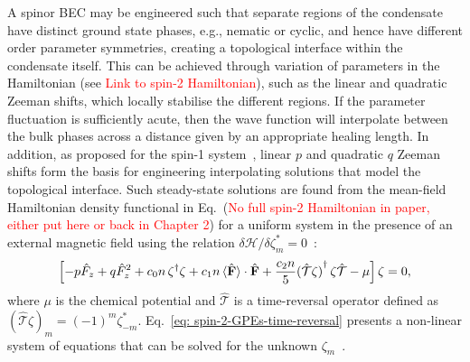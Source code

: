 A spinor BEC may be engineered such that separate regions of the condensate
have distinct ground state phases, e.g., nematic or cyclic, and hence have
different order parameter symmetries, creating a topological interface within
the condensate itself.
This can be achieved through variation of parameters in the Hamiltonian (see
\textcolor{red}{Link to spin-2 Hamiltonian}), such as the linear and quadratic
Zeeman shifts, which locally stabilise the different regions.
If the parameter fluctuation is sufficiently acute, then the wave function will
interpolate between the bulk phases across a distance given by an appropriate
healing length.
In addition, as proposed for the spin-1 system~\cite{Borgh2014}, linear \(p\)
and quadratic \(q\) Zeeman shifts form the basis for engineering interpolating
solutions that model the topological interface.
Such steady-state solutions are found from the mean-field Hamiltonian density
functional in Eq.~(\textcolor{red}{No full spin-2 Hamiltonian in paper, either
    put here or back in Chapter 2}) for a uniform system in the presence of an
external magnetic field using the relation \(\delta \mathcal{H}
/ \delta \zeta_m^*=0\)~\cite{Kawaguchi2012}:
\begin{equation}\label{eq: spin-2-GPEs-time-reversal}
    \left[-p \hat{F}_z + q \hat{F}^2_z + c_0n \, \zeta^\dagger \zeta
        + c_1n \, \langle\hat{\vb{F}}\rangle\cdot\hat{\vb{F}}
        + \frac{c_2n}{5}{(\hat{\mathcal{T}}\zeta)}^\dagger \,
        \zeta\hat{\mathcal{T}} -\mu \right] \zeta = 0,
\end{equation}
where \(\mu \) is the chemical potential and \(\hat{\mathcal{T}}\) is a
time-reversal operator defined as \({(\hat{\mathcal{T}}\zeta)}_m =
{(-1)}^m\zeta_{-m}^*\).
Eq.~\eqref{eq: spin-2-GPEs-time-reversal} presents a non-linear system of
equations that can be solved for the unknown
\(\zeta_m\)~\cite{Ciobanu2000,Kawaguchi2012}.

